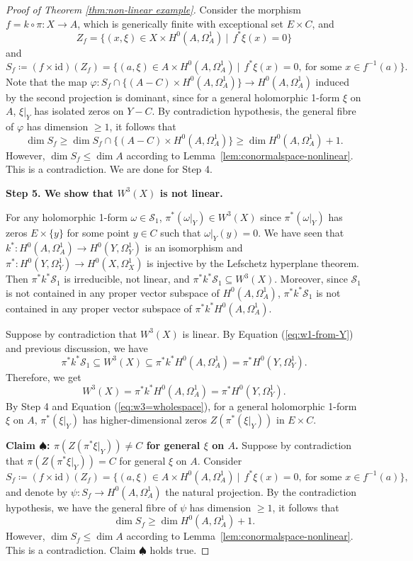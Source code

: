 \documentclass[a4paper,12pt,reqno]{amsart}
\theoremstyle{question}
\theoremstyle{definition}
\theoremstyle{remark}
\theoremstyle{cited}
\theoremstyle{citeddef}
\def\phi{{\varphi}}
\def\cS{\mathcal{S}}
\begin{document}
\begin{proof}[Proof of Theorem \ref{thm:non-linear example}]
 
 Consider the morphism $f=k\circ\pi\colon X \to A$, which is generically finite with exceptional set $E\times C$, and
 $$Z_{f}=\{(x,\xi)\in X\times H^{0}(A,\Omega^{1}_{A}) ~|~~ f^{*}\xi(x)=0 \}$$ and $$S_{f}\coloneqq(f\times \mathrm{id})(Z_{f})=\{(a,\xi)\in A\times H^{0}(A,\Omega^{1}_{A}) ~|~~  f^{*}\xi(x)=0,\ \text{for some }x\in f^{-1}(a) \}.$$
Note that the  map $\phi\colon S_f\cap \{(A-C)\times H^0(A, \Omega_A^1)\}\to H^0(A, \Omega_A^1)$ induced by the second projection is dominant, since for a general holomorphic 1-form $\xi$ on $A$, $\xi|_Y$ has isolated zeros on $Y-C$. By contradiction hypothesis, the general fibre of $\phi$ has dimension $\geq 1$, it follows that $$\dim S_f\geq \dim S_f\cap \{(A-C)\times H^0(A, \Omega_A^1)\}\geq \dim H^0(A, \Omega_A^1)+1.$$ However, $\dim S_f\leq \dim A$ according to Lemma~\ref{lem:conormalspace-nonlinear}. This is a contradiction. We are done for Step 4.


\textbf{Step 5. We show that $W^3(X)$ is not linear.}

For any holomorphic 1-form $\omega\in \cS_1$, $\pi^{\ast}(\omega|_Y)\in W^3(X)$ since $\pi^{\ast}(\omega|_Y)$ has zeros $E\times\{y\}$ for some point $y\in C$ such that $\omega|_Y(y)=0$. We have seen that $k^\ast\colon H^0(A, \Omega_A^1)\to H^0(Y, \Omega_Y^1)$ is an isomorphism and $\pi^{\ast}\colon H^0(Y, \Omega_Y^1)\to H^0(X, \Omega_X^1)$ is injective by the Lefschetz hyperplane theorem. Then  $\pi^{\ast}k^\ast\cS_1$ is irreducible, not linear, and $\pi^{\ast}k^\ast\cS_1\subseteq W^3(X)$.  Moreover, since $\cS_1$ is not contained in any proper vector subspace of $H^0(A,\Omega_A^1)$, $\pi^{\ast}k^\ast\cS_1$ is not contained in any proper vector subspace of $\pi^{\ast}k^\ast H^0(A,\Omega_A^1)$.

Suppose by contradiction that $W^3(X)$ is linear. By Equation (\ref{eq:w1-from-Y}) and previous discussion, we have $$\pi^{\ast}k^\ast\cS_1\subseteq W^3(X)\subseteq\pi^{\ast}k^\ast H^0(A,\Omega_A^1)=\pi^{\ast}H^0(Y,\Omega_Y^1).$$  %
Therefore, we get 
\begin{equation}\label{eq:w3=wholespace}
    W^3(X)=\pi^{\ast}k^\ast H^0(A,\Omega_A^1)=\pi^{\ast}H^0(Y,\Omega_Y^1).
\end{equation} 
By Step 4 and Equation (\ref{eq:w3=wholespace}), for a general holomorphic 1-form $\xi$ on $A$, $\pi^{\ast}(\xi|_Y)$ has higher-dimensional zeros $Z(\pi^{\ast}(\xi|_Y))$ in $E\times C$. 

\textbf{Claim $\spadesuit$: $\pi (Z(\pi^{\ast}\xi|_Y))\neq C$ for general $\xi$ on $A$.} Suppose by contradiction that $\pi (Z(\pi^{\ast}\xi|_Y))=C$  for general $\xi$ on $A$. Consider $$S_{f}\coloneqq(f\times \mathrm{id})(Z_{f})=\{(a,\xi)\in A\times H^{0}(A,\Omega^{1}_{A}) ~|~~  f^{*}\xi(x)=0,\ \text{for some }x\in f^{-1}(a) \},$$
and denote  by $\psi\colon S_f\to H^0(A,\Omega_A^1)$ the natural projection. By the contradiction hypothesis, we have the general fibre of $\psi$ has dimension $\geq 1$, it follows that $$\dim S_f \geq \dim H^0(A, \Omega_A^1)+1.$$ However, $\dim S_f\leq \dim A$ according to Lemma~\ref{lem:conormalspace-nonlinear}. This is a contradiction. Claim $\spadesuit$ holds true.


\end{proof}
\end{document}
